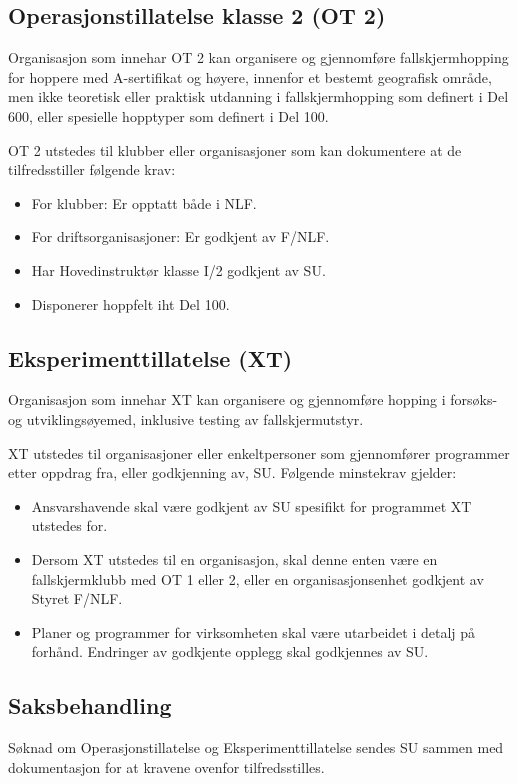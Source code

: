 \subsection{Operasjonstillatelse klasse 2 (OT 2)}
Organisasjon som innehar OT 2 kan organisere og gjennomføre fallskjermhopping for hoppere med A-sertifikat og høyere, innenfor et bestemt geografisk område, men ikke teoretisk eller praktisk utdanning i fallskjermhopping som definert i Del 600, eller spesielle hopptyper som definert i Del 100.

OT 2 utstedes til klubber eller organisasjoner som kan dokumentere at de tilfredsstiller følgende krav:
\begin{itemize}
	\item For klubber: Er opptatt både i NLF.
	\item For driftsorganisasjoner: Er godkjent av F/NLF.
	\item Har Hovedinstruktør klasse I/2 godkjent av SU.
	\item Disponerer hoppfelt iht Del 100.
\end{itemize}

\subsection{Eksperimenttillatelse (XT)}
Organisasjon som innehar XT kan organisere og gjennomføre hopping i forsøks- og utviklingsøyemed, inklusive testing av fallskjermutstyr.

XT utstedes til organisasjoner eller enkeltpersoner som gjennomfører programmer etter oppdrag fra, eller godkjenning av, SU. Følgende minstekrav gjelder:
\begin{itemize}
	\item Ansvarshavende skal være godkjent av SU spesifikt for programmet XT utstedes for.
	\item Dersom XT utstedes til en organisasjon, skal denne enten være en fallskjermklubb med OT 1 eller 2, eller en organisasjonsenhet godkjent av Styret F/NLF.
	\item Planer og programmer for virksomheten skal være utarbeidet i detalj på forhånd. Endringer av godkjente opplegg skal godkjennes av SU.
\end{itemize}

\subsection{Saksbehandling}
Søknad om Operasjonstillatelse og Eksperimenttillatelse sendes SU sammen med dokumentasjon for at kravene ovenfor tilfredsstilles.

